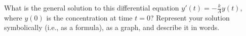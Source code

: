 \documentclass{ximera}
\begin{document}
\begin{question}
What is the general solution to this differential equation $y'(t)=-\frac{k}{A}y(t)$, where $y(0)$ is the concentration at time $t=0$? 
 Represent your solution symbolically (i.e., as a formula), as a graph, and describe it in words.   
\begin{freeResponse}
\end{freeResponse}
\end{question}

\end{document}

